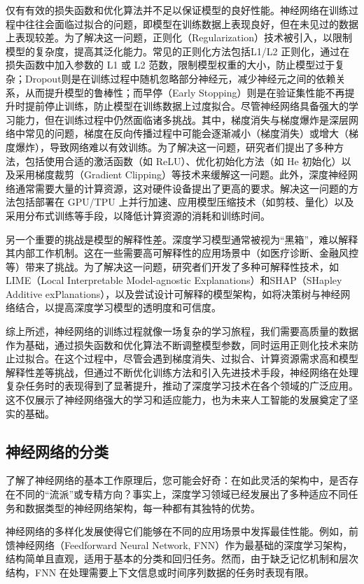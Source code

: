 仅有有效的损失函数和优化算法并不足以保证模型的良好性能。神经网络在训练过程中往往会面临过拟合的问题，即模型在训练数据上表现良好，但在未见过的数据上表现较差。为了解决这一问题，正则化（Regularization）技术被引入，以限制模型的复杂度，提高其泛化能力。常见的正则化方法包括L1/L2 正则化，通过在损失函数中加入参数的 L1 或 L2 范数，限制模型权重的大小，防止模型过于复杂；Dropout则是在训练过程中随机忽略部分神经元，减少神经元之间的依赖关系，从而提升模型的鲁棒性；而早停（Early Stopping）则是在验证集性能不再提升时提前停止训练，防止模型在训练数据上过度拟合。尽管神经网络具备强大的学习能力，但在训练过程中仍然面临诸多挑战。其中，梯度消失与梯度爆炸是深层网络中常见的问题，梯度在反向传播过程中可能会逐渐减小（梯度消失）或增大（梯度爆炸），导致网络难以有效训练。为了解决这一问题，研究者们提出了多种方法，包括使用合适的激活函数（如 ReLU）、优化初始化方法（如 He 初始化）以及采用梯度裁剪（Gradient Clipping）等技术来缓解这一问题。此外，深度神经网络通常需要大量的计算资源，这对硬件设备提出了更高的要求。解决这一问题的方法包括部署在 GPU/TPU 上并行加速、应用模型压缩技术（如剪枝、量化）以及采用分布式训练等手段，以降低计算资源的消耗和训练时间。

另一个重要的挑战是模型的解释性差。深度学习模型通常被视为“黑箱”，难以解释其内部工作机制。这在一些需要高可解释性的应用场景中（如医疗诊断、金融风控等）带来了挑战。为了解决这一问题，研究者们开发了多种可解释性技术，如LIME（Local Interpretable Model-agnostic Explanations）和SHAP（SHapley Additive exPlanations），以及尝试设计可解释的模型架构，如将决策树与神经网络结合，以提高深度学习模型的透明度和可信度。

综上所述，神经网络的训练过程就像一场复杂的学习旅程，我们需要高质量的数据作为基础，通过损失函数和优化算法不断调整模型参数，同时运用正则化技术来防止过拟合。在这个过程中，尽管会遇到梯度消失、过拟合、计算资源需求高和模型解释性差等挑战，但通过不断优化训练方法和引入先进技术手段，神经网络在处理复杂任务时的表现得到了显著提升，推动了深度学习技术在各个领域的广泛应用。这不仅展示了神经网络强大的学习和适应能力，也为未来人工智能的发展奠定了坚实的基础。
    
\subsection{神经网络的分类}

了解了神经网络的基本工作原理后，您可能会好奇：在如此灵活的架构中，是否存在不同的“流派”或专精方向？事实上，深度学习领域已经发展出了多种适应不同任务和数据类型的神经网络架构，每一种都有其独特的优势。

神经网络的多样化发展使得它们能够在不同的应用场景中发挥最佳性能。例如，前馈神经网络（Feedforward Neural Network, FNN）作为最基础的深度学习架构，结构简单且直观，适用于基本的分类和回归任务。然而，由于缺乏记忆机制和层次结构，FNN 在处理需要上下文信息或时间序列数据的任务时表现有限。

